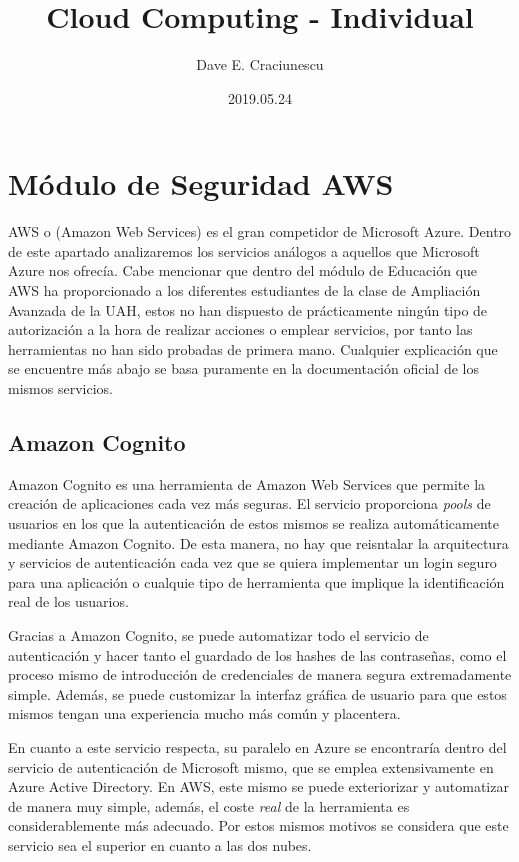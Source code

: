 \documentclass{article}
\title{Cloud Computing - Individual}
\author{Dave E. Craciunescu}
\date{2019.05.24}
\begin{document}
\maketitle

\section*{Módulo de Seguridad AWS}

AWS o (Amazon Web Services) es el gran competidor de Microsoft Azure. Dentro de
este apartado analizaremos los servicios análogos a aquellos que Microsoft Azure
nos ofrecía. Cabe mencionar que dentro del módulo de Educación que AWS ha
proporcionado a los diferentes estudiantes de la clase de Ampliación Avanzada de
la UAH, estos no han dispuesto de prácticamente ningún tipo de autorización a la
hora de realizar acciones o emplear servicios, por tanto las herramientas no han
sido probadas de primera mano. Cualquier explicación que se encuentre más abajo
se basa puramente en la documentación oficial de los mismos servicios.

\subsection*{Amazon Cognito}
Amazon Cognito es una herramienta de Amazon Web Services que permite la creación
de aplicaciones cada vez más seguras. El servicio proporciona \textit{pools} de
usuarios en los que la autenticación de estos mismos se realiza automáticamente
mediante Amazon Cognito. De esta manera, no hay que reisntalar la arquitectura y
servicios de autenticación cada vez que se quiera implementar un login seguro
para una aplicación o cualquie tipo de herramienta que implique la
identificación real de los usuarios. 

Gracias a Amazon Cognito, se puede automatizar todo el servicio de
autenticación y hacer tanto el guardado de los hashes de las contraseñas, como
el proceso mismo de introducción de credenciales de manera segura extremadamente
simple. Además, se puede customizar la interfaz gráfica de usuario para que
estos mismos tengan una experiencia mucho más común y placentera. 

En cuanto a este servicio respecta, su paralelo en Azure se encontraría dentro
del servicio de autenticación de Microsoft mismo, que se emplea extensivamente
en Azure Active Directory. En AWS, este mismo se puede exteriorizar y
automatizar de manera muy simple, además, el coste \textit{real} de la
herramienta es considerablemente más adecuado. Por estos mismos motivos se
considera que este servicio sea el superior en cuanto a las dos nubes.
\end{document}

